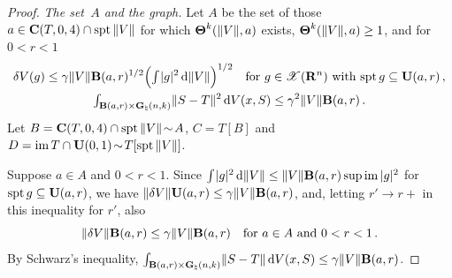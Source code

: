 \begin{proof}
    \emph{The set~$A$ and the graph.} Let $A$ be the set of those $a \in \mathbf{C} ( T, 0, 4 ) \cap
    \operatorname{spt} \|V\|$ for which $\boldsymbol{\Theta}^{k}(\|V\|,a)$ exists, $\boldsymbol{\Theta}^{k}(\|V\|,a) \ge 1$, and
    for $0 < r < 1$
    \begin{gather*}
        \delta V(g) \le \gamma \|V\| \mathbf{B}(a,r)^{1/2} \Big( {\textstyle\int_{}^{}} |g|^2 \,\mathrm{d} \|V\|
        \Big)^{1/2} \quad \text{for $g \in \mathscr{X}(\mathbf{R}^{n})$ with $\operatorname{spt} g \subseteq \mathbf{U}(a,r)$}
        \,, \\
        {\textstyle\int_{\mathbf{B}(a,r) \times \mathbf{G}_{\natural}(n,k)}^{}} \|S - T\|^2 \,\mathrm{d} V(x,S) \le \gamma^2
        \|V\| \mathbf{B}(a,r) \,.
    \end{gather*}
    Let $B = \mathbf{C} ( T, 0, 4 ) \cap \operatorname{spt} \|V\| \!\sim\! A$, $C = T[B]$ and $D = \operatorname{im} T \cap
    \mathbf{U}(0,1) \!\sim\! T[\operatorname{spt} \|V\|]$.

    Suppose $a \in A$ and $0 < r < 1$. Since ${\textstyle\int_{}^{}} |g|^2 \,\mathrm{d} \|V\| \le \|V\| \mathbf{B}(a,r)
    \sup \operatorname{im} |g|^2$ for $\operatorname{spt} g \subseteq \mathbf{U}(a,r)$, we have $\|\delta V\| \mathbf{U}(a,r) \le
    \gamma \|V\| \mathbf{B}(a,r)$, and, letting $r' \to r+$ in this inequality for $r'$, also
    \begin{equation}
        \label{eq:8.12:c}
        \|\delta V\| \mathbf{B}(a,r) \le \gamma \|V\| \mathbf{B}(a,r) \quad \text{for $a \in A$ and $0 <
        r < 1$} \,.
    \end{equation}
    By Schwarz's inequality, ${\textstyle\int_{\mathbf{B}(a,r) \times \mathbf{G}_{\natural}(n,k)}^{}} \|S - T\| \,\mathrm{d}
    V(x,S) \le \gamma \|V\| \mathbf{B}(a,r)$.


\end{proof}
